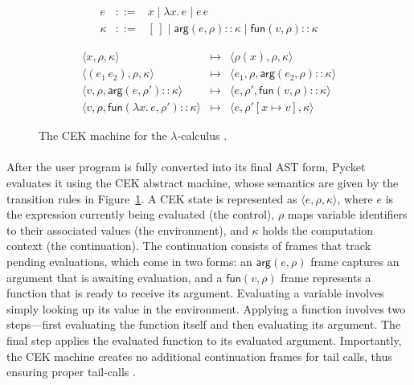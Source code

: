         \begin{figure}[t]
        \centering
        \[
        \begin{array}{lcl}
            e &::=& x \mid \lambda x.\,e \mid e\,e \\[4pt]
            \kappa &::=& [\,]
                    \mid \mathsf{arg}(e,\rho)::\kappa
                    \mid \mathsf{fun}(v,\rho)::\kappa
        \end{array}
        \]

        \[
        \begin{array}{rcl}
            \langle x,\rho,\kappa \rangle
            &\longmapsto&
            \langle \rho(x),\rho,\kappa \rangle \\[6pt]

            \langle (e_1\,e_2),\rho,\kappa \rangle
            &\longmapsto&
            \langle e_1,\rho,\mathsf{arg}(e_2,\rho)::\kappa \rangle \\[6pt]

            \langle v,\rho,\mathsf{arg}(e,\rho')::\kappa \rangle
            &\longmapsto&
            \langle e,\rho',\mathsf{fun}(v,\rho)::\kappa \rangle \\[6pt]

            \langle v,\rho,\mathsf{fun}(\lambda x.\,e,\rho')::\kappa \rangle
            &\longmapsto&
            \langle e,\rho'[x \mapsto v],\kappa \rangle
        \end{array}
        \]
        \caption{The CEK machine for the $\lambda$‑calculus \cite{pycketmain}.}
        \label{fig:cek-formal}
        \end{figure}

        \paragraph{}%
            After the user program is fully converted into its final AST form, Pycket evaluates it using the CEK abstract machine, whose semantics are given by the transition rules in Figure~\ref{fig:cek-formal}. A CEK state is represented as $\langle e,\rho,\kappa\rangle$, where $e$ is the expression currently being evaluated (the control), $\rho$ maps variable identifiers to their associated values (the environment), and $\kappa$ holds the computation context (the continuation). The continuation consists of frames that track pending evaluations, which come in two forms: an $\mathsf{arg}(e,\rho)$ frame captures an argument that is awaiting evaluation, and a $\mathsf{fun}(v,\rho)$ frame represents a function that is ready to receive its argument. Evaluating a variable involves simply looking up its value in the environment. Applying a function involves two steps—first evaluating the function itself and then evaluating its argument. The final step applies the evaluated function to its evaluated argument. Importantly, the CEK machine creates no additional continuation frames for tail calls, thus ensuring proper tail-calls \cite{pycketmain}.

